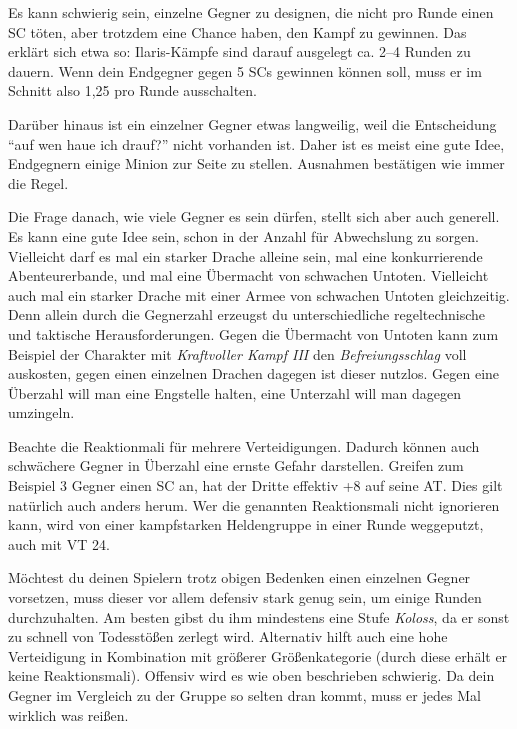 Es kann schwierig sein, einzelne Gegner zu designen, die nicht pro Runde einen SC töten, aber trotzdem eine Chance haben, den Kampf zu gewinnen. Das erklärt sich etwa so: Ilaris-Kämpfe sind darauf ausgelegt ca. 2--4 Runden zu dauern. Wenn dein Endgegner gegen 5 SCs gewinnen können soll, muss er im Schnitt also 1,25 pro Runde ausschalten.

 Darüber hinaus ist ein einzelner Gegner etwas langweilig, weil die Entscheidung \enquote{auf wen haue ich drauf?} nicht vorhanden ist.
 Daher ist es meist eine gute Idee, Endgegnern einige Minion zur Seite zu stellen.
 Ausnahmen bestätigen wie immer die Regel. 

Die Frage danach, wie viele Gegner es sein dürfen, stellt sich aber auch generell.
Es kann eine gute Idee sein, schon in der Anzahl für Abwechslung zu sorgen.
Vielleicht darf es mal ein starker Drache alleine sein, mal eine konkurrierende Abenteurerbande, und mal eine Übermacht von schwachen Untoten.
Vielleicht auch mal ein starker Drache mit einer Armee von schwachen Untoten gleichzeitig.
Denn allein durch die Gegnerzahl erzeugst du unterschiedliche regeltechnische und taktische Herausforderungen.
Gegen die Übermacht von Untoten kann zum Beispiel der Charakter mit \textit{Kraftvoller Kampf III} den \textit{Befreiungsschlag} voll auskosten, gegen einen einzelnen Drachen dagegen ist dieser nutzlos.
Gegen eine Überzahl will man eine Engstelle halten, eine Unterzahl will man dagegen umzingeln.


Beachte die Reaktionmali für mehrere Verteidigungen. Dadurch können auch schwächere Gegner in Überzahl eine ernste Gefahr darstellen. Greifen zum Beispiel 3 Gegner einen SC an, hat der Dritte effektiv +8 auf seine AT.
Dies gilt natürlich auch anders herum.
Wer die genannten Reaktionsmali nicht ignorieren kann, wird von einer kampfstarken Heldengruppe in einer Runde weggeputzt, auch mit VT 24.

Möchtest du deinen Spielern trotz obigen Bedenken einen einzelnen Gegner vorsetzen, muss dieser vor allem defensiv stark genug sein, um einige Runden durchzuhalten. Am besten gibst du ihm mindestens eine Stufe \textit{Koloss}, da er sonst zu schnell von Todesstößen zerlegt wird.
Alternativ hilft auch eine hohe Verteidigung in Kombination mit größerer Größenkategorie (durch diese erhält er keine Reaktionsmali).
Offensiv wird es wie oben beschrieben schwierig.
Da dein Gegner im Vergleich zu der Gruppe so selten dran kommt, muss er jedes Mal wirklich was reißen. %


